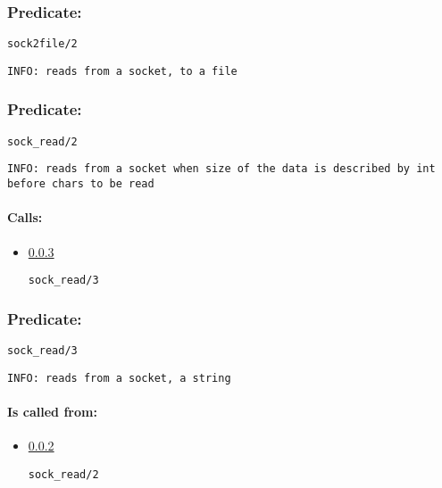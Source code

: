 \subsubsection{Predicate:} \label{sock2fileV95W2}

\begin{verbatim}
sock2file/2
\end{verbatim}

{\small \begin{verbatim}
INFO: reads from a socket, to a file

\end{verbatim}}

\subsubsection{Predicate:} \label{sockV95WreadV95W2}

\begin{verbatim}
sock_read/2
\end{verbatim}

{\small \begin{verbatim}
INFO: reads from a socket when size of the data is described by int before chars to be read

\end{verbatim}}
\paragraph{Calls:} 
\begin{itemize}
\item \ref{sockV95WreadV95W3} 
\begin{verbatim}
sock_read/3
\end{verbatim}

\end{itemize}

\subsubsection{Predicate:} \label{sockV95WreadV95W3}

\begin{verbatim}
sock_read/3
\end{verbatim}

{\small \begin{verbatim}
INFO: reads from a socket, a string

\end{verbatim}}
\paragraph{Is called from:} 
\begin{itemize}
\item \ref{sockV95WreadV95W2} 
\begin{verbatim}
sock_read/2
\end{verbatim}

\end{itemize}

